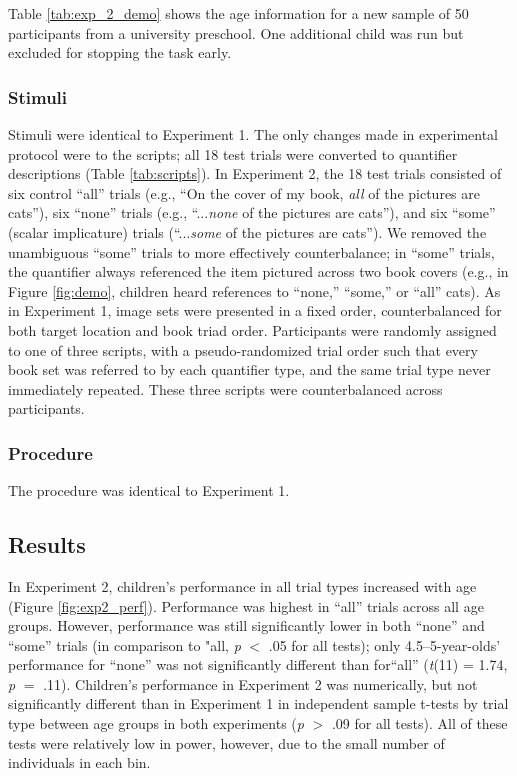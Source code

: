 \documentclass[man]{apa2}
\begin{document}
Table \ref{tab:exp_2_demo} shows the age information for a new sample of 50 participants from a university preschool. One additional child was run but excluded for stopping the task early.
\subsubsection{Stimuli}

Stimuli were identical to Experiment 1. The only changes made in experimental protocol were to the scripts;  all 18 test trials were converted to quantifier descriptions (Table \ref{tab:scripts}). In Experiment 2, the 18 test trials consisted of six control ``all'' trials (e.g., ``On the cover of my book, \textit{all} of the pictures are cats''), six ``none'' trials (e.g., ``...\textit{none} of the pictures are cats''), and six ``some'' (scalar implicature) trials (``...\textit{some} of the pictures are cats''). We removed the unambiguous ``some'' trials to more effectively counterbalance; in ``some'' trials, the quantifier always referenced the item pictured across two book covers (e.g., in Figure \ref{fig:demo}, children heard references to ``none,'' ``some,'' or ``all'' cats). As in Experiment 1, image sets were presented in a fixed order, counterbalanced for both target location and book triad order. Participants were randomly assigned to one of three scripts, with a pseudo-randomized trial order such that every book set was referred to by each quantifier type, and the same trial type never immediately repeated. These three scripts were counterbalanced across participants.

\subsubsection{Procedure}
The procedure was identical to Experiment 1.

\subsection{Results}

In Experiment 2, children's performance in all trial types increased with age (Figure \ref{fig:exp2_perf}). Performance was highest in ``all'' trials across all age groups. However, performance was still significantly lower in both ``none'' and ``some'' trials (in comparison to "all, \emph{p} $<$ .05 for all tests); only 4.5--5-year-olds' performance for ``none'' was not significantly different than for``all'' (\emph{t}(11) = 1.74, \emph{p} $=$ .11). Children's performance in Experiment 2 was numerically, but not significantly different than in Experiment 1 in independent sample t-tests by trial type between age groups in both experiments (\emph{p} $>$ .09 for all tests). All of these tests were relatively low in power, however, due to the small number of individuals in each bin.
\end{document}
